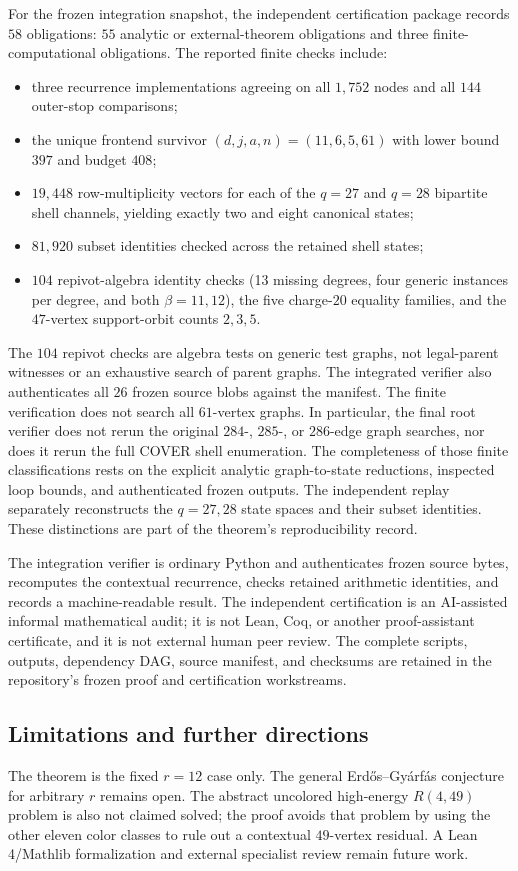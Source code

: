 For the frozen integration snapshot, the independent certification package records $58$ obligations: $55$ analytic or external-theorem obligations and three finite-computational obligations. The reported finite checks include:
\begin{itemize}
\item three recurrence implementations agreeing on all $1,752$ nodes and all $144$ outer-stop comparisons;
\item the unique frontend survivor $(d,j,a,n)=(11,6,5,61)$ with lower bound $397$ and budget $408$;
\item $19,448$ row-multiplicity vectors for each of the $q=27$ and $q=28$ bipartite shell channels, yielding exactly two and eight canonical states;
\item $81,920$ subset identities checked across the retained shell states;
\item $104$ repivot-algebra identity checks (13 missing degrees, four generic instances per degree, and both $\beta=11,12$), the five charge-$20$ equality families, and the $47$-vertex support-orbit counts $2,3,5$.
\end{itemize}

The $104$ repivot checks are algebra tests on generic test graphs, not legal-parent witnesses or an exhaustive search of parent graphs. The integrated verifier also authenticates all $26$ frozen source blobs against the manifest. The finite verification does not search all $61$-vertex graphs. In particular, the final root verifier does not rerun the original $284$-, $285$-, or $286$-edge graph searches, nor does it rerun the full COVER shell enumeration. The completeness of those finite classifications rests on the explicit analytic graph-to-state reductions, inspected loop bounds, and authenticated frozen outputs. The independent replay separately reconstructs the $q=27,28$ state spaces and their subset identities. These distinctions are part of the theorem's reproducibility record.

The integration verifier is ordinary Python and authenticates frozen source bytes, recomputes the contextual recurrence, checks retained arithmetic identities, and records a machine-readable result. The independent certification is an AI-assisted informal mathematical audit; it is not Lean, Coq, or another proof-assistant certificate, and it is not external human peer review. The complete scripts, outputs, dependency DAG, source manifest, and checksums are retained in the repository's frozen proof and certification workstreams.

\subsection{Limitations and further directions}

The theorem is the fixed $r=12$ case only. The general Erd\H{o}s--Gy\'arf\'as conjecture for arbitrary $r$ remains open. The abstract uncolored high-energy $R(4,49)$ problem is also not claimed solved; the proof avoids that problem by using the other eleven color classes to rule out a contextual $49$-vertex residual. A Lean 4/Mathlib formalization and external specialist review remain future work.

